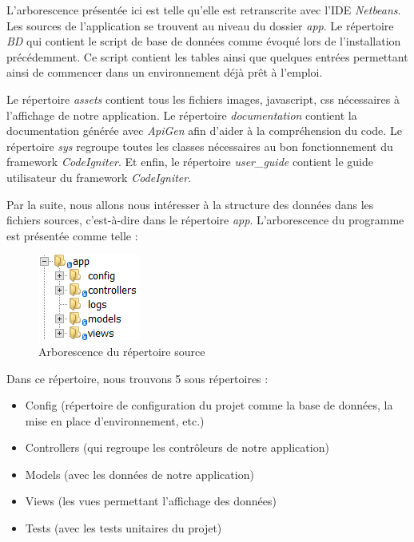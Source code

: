 \documentclass{polytech/polytech}
\begin{document}
L'arborescence présentée ici est telle qu'elle est retranscrite avec l'IDE \textit{Netbeans}. Les sources de l'application se trouvent au niveau du dossier \textit{app}. Le répertoire \textit{BD} qui contient le script de base de données comme évoqué lors de l'installation précédemment. Ce script contient les tables ainsi que quelques entrées permettant ainsi de commencer dans un environnement déjà prêt à l'emploi.

Le répertoire \textit{assets} contient tous les fichiers images, javascript, css nécessaires à l'affichage de notre application. Le répertoire \textit{documentation} contient la documentation générée avec \textit{ApiGen} afin d'aider à la compréhension du code. Le répertoire \textit{sys} regroupe toutes les classes nécessaires au bon fonctionnement du framework \textit{CodeIgniter}. Et enfin, le répertoire \textit{user\_guide} contient le guide utilisateur du framework \textit{CodeIgniter}.

Par la suite, nous allons nous intéresser à la structure des données dans les fichiers sources, c'est-à-dire dans le répertoire \textit{app}. L'arborescence du programme est présentée comme telle : 

\begin{figure}
	\includegraphics[scale=1]{images/arboMVC}
	\caption{Arborescence du répertoire source}
	\label{fig:arboSource}
\end{figure}

Dans ce répertoire, nous trouvons 5 sous répertoires : 

\begin{itemize}
	\item Config (répertoire de configuration du projet comme la base de données, la mise en place d'environnement, etc.)
	\item Controllers (qui regroupe les contrôleurs de notre application)
	\item Models (avec les données de notre application)
	\item Views (les vues permettant l'affichage des données) 
	\item Tests (avec les tests unitaires du projet)
\end{itemize}
\end{document}
